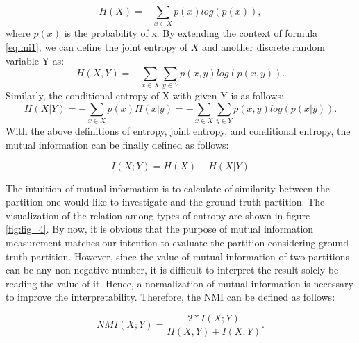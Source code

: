 \documentclass[12pt]{article}
\begin{document}
\begin{equation}\label{eq:mi1}
H(X) = - \sum_{x\in X} p(x)  log(p(x)),
\end{equation}where $p(x)$ is the probability of x.
\bigbreak
By extending the context of  formula \ref{eq:mi1}, we can define the joint entropy of $X$ and another discrete random variable Y as:
\begin{equation}\label{eq:mi2}
H(X, Y) = - \sum_{x\in X} \sum_{y \in Y} p(x, y)  log(p(x, y)).
\end{equation}
\bigbreak
Similarly,  the conditional entropy of X with given Y is as follows:
\begin{equation}\label{eq:mi3}
H(X|Y) = -\sum_{x \in X} p(x) H(x|y) = -\sum_{x \in X}\sum_{y \in Y} p(x,y) log(p(x|y)).
\end{equation}
With the above definitions of entropy, joint entropy, and conditional entropy, the mutual information can be finally defined as follows:

\begin{equation}\label{eq:mi4}
I(X;Y) = H(X) - H(X|Y)
\end{equation}

The intuition of mutual information is to calculate of similarity between the partition one would like to investigate and the ground-truth partition. The visualization of the relation among types of entropy are shown in figure \ref{fig:fig_4}. By now, it is obvious that the purpose of mutual information measurement matches our intention to evaluate the partition considering ground-truth partition. However, since the value of mutual information of two partitions can be any non-negative number, it is difficult to interpret the result solely be reading the value of it. Hence, a normalization of mutual information is necessary to improve the interpretability. Therefore, the NMI can be defined as follows:

\begin{equation}\label{eq:nmi}
NMI(X;Y) = \frac{2*I(X; Y)}{H(X,Y) + I(X;Y)}.
\end{equation}
\end{document}
